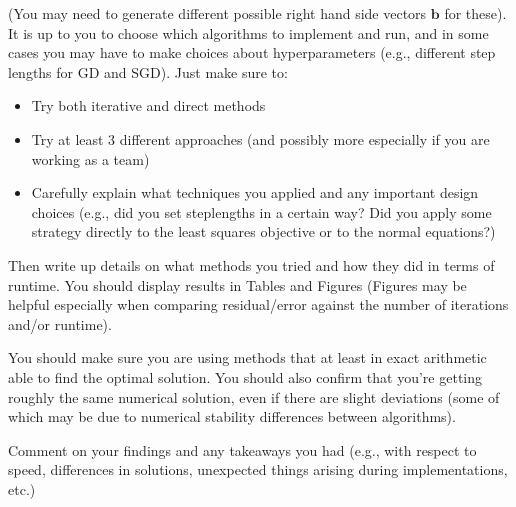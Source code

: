\documentclass{article}
\newcommand{\vb}{\textbf{b}}
\begin{document}
(You may need to generate different possible right hand side vectors $\vb$ for these). It is up to you to choose which algorithms to implement and run, and in some cases you may have to make choices about hyperparameters (e.g., different step lengths for GD and SGD). Just make sure to:
\begin{itemize}
	\item Try both iterative and direct methods
	\item Try at least 3 different approaches (and possibly more especially if you are working as a team)
	\item Carefully explain what techniques you applied and any important design choices (e.g., did you set steplengths in a certain way? Did you apply some strategy directly to the least squares objective or to the normal equations?)
\end{itemize}
Then write up details on what methods you tried and how they did in terms of runtime. You should display results in Tables and Figures (Figures may be helpful especially when comparing residual/error against the number of iterations and/or runtime).

You should make sure you are using methods that at least in exact arithmetic able to find the optimal solution. You should also confirm that you're getting roughly the same numerical solution, even if there are slight deviations (some of which may be due to numerical stability differences between algorithms).

Comment on your findings and any takeaways you had (e.g., with respect to speed, differences in solutions, unexpected things arising during implementations, etc.)
\end{document}
